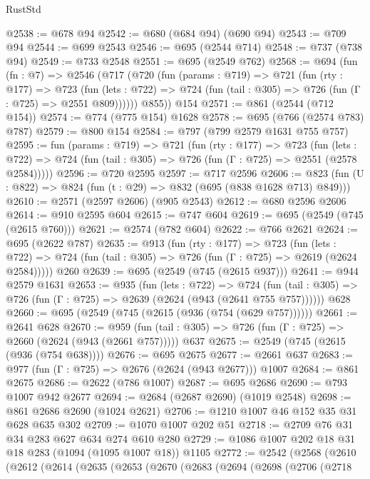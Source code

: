 \begin{lexlean}{RustStd}
\begin{coremodule}
@2538 := @678 @94
@2542 := @680 (@684 @94) (@690 @94)
@2543 := @709 @94
@2544 := @699 @2543
@2546 := @695 (@2544 @714)
@2548 := @737 (@738 @94)
@2549 := @733 @2548
@2551 := @695 (@2549 @762)
@2568 := @694
    (fun (fn : @7) =>
    @2546
      (@717
        (@720
          (fun (params : @719) =>
          @721
            (fun (rty : @177) =>
            @723
              (fun (lets : @722) =>
              @724 (fun (tail : @305) => @726 (fun (Γ : @725) => @2551 @809))))))
        @855))
    @154
@2571 := @861 (@2544 (@712 @154))
@2574 := @774 (@775 @154) @1628
@2578 := @695 (@766 (@2574 @783) @787)
@2579 := @800 @154
@2584 := @797 (@799 @2579 @1631 @755 @757)
@2595 := fun (params : @719) =>
  @721
    (fun (rty : @177) =>
    @723
      (fun (lets : @722) =>
      @724 (fun (tail : @305) => @726 (fun (Γ : @725) => @2551 (@2578 @2584)))))
@2596 := @720 @2595
@2597 := @717 @2596
@2606 := @823 (fun (U : @822) => @824 (fun (t : @29) => @832 (@695 (@838 @1628 @713) @849)))
@2610 := @2571 (@2597 @2606) (@905 @2543)
@2612 := @680 @2596 @2606
@2614 := @910 @2595 @604
@2615 := @747 @604
@2619 := @695 (@2549 (@745 (@2615 @760)))
@2621 := @2574 (@782 @604)
@2622 := @766 @2621
@2624 := @695 (@2622 @787)
@2635 := @913
    (fun (rty : @177) =>
    @723
      (fun (lets : @722) =>
      @724 (fun (tail : @305) => @726 (fun (Γ : @725) => @2619 (@2624 @2584)))))
    @260
@2639 := @695 (@2549 (@745 (@2615 @937)))
@2641 := @944 @2579 @1631
@2653 := @935
    (fun (lets : @722) =>
    @724 (fun (tail : @305) => @726 (fun (Γ : @725) => @2639 (@2624 (@943 (@2641 @755 @757))))))
    @628
@2660 := @695 (@2549 (@745 (@2615 (@936 (@754 (@629 @757))))))
@2661 := @2641 @628
@2670 := @959 (fun (tail : @305) => @726 (fun (Γ : @725) => @2660 (@2624 (@943 (@2661 @757))))) @637
@2675 := @2549 (@745 (@2615 (@936 (@754 @638))))
@2676 := @695 @2675
@2677 := @2661 @637
@2683 := @977 (fun (Γ : @725) => @2676 (@2624 (@943 @2677))) @1007
@2684 := @861 @2675
@2686 := @2622 (@786 @1007)
@2687 := @695 @2686
@2690 := @793 @1007 @942 @2677
@2694 := @2684 (@2687 @2690) (@1019 @2548)
@2698 := @861 @2686 @2690 (@1024 @2621)
@2706 := @1210 @1007 @46 @152 @35 @31 @628 @635 @302
@2709 := @1070 @1007 @202 @51
@2718 := @2709 @76 @31 @34 @283 @627 @634 @274 @610 @280
@2729 := @1086 @1007 @202 @18 @31 @18 @283 (@1094 (@1095 @1007 @18)) @1105
@2772 := @2542
    (@2568
      (@2610
        (@2612
          (@2614
            (@2635
              (@2653
                (@2670
                  (@2683
                    (@2694
                      (@2698
                        (@2706
                          (@2718

\end{coremodule}
\end{lexlean}
